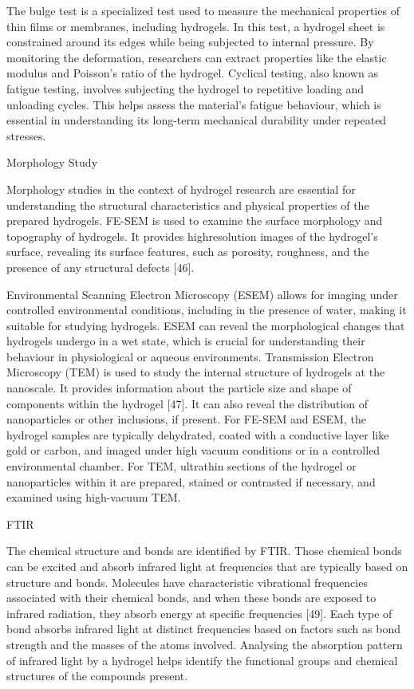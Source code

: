 \documentclass[../../main-notes.tex]{subfiles}
\begin{document}
The bulge test is a specialized test used to measure the mechanical properties of thin films or membranes, including hydrogels. 
In this test, a hydrogel sheet is constrained around its edges while being subjected to internal pressure. 
By monitoring the deformation, researchers can extract properties like the elastic modulus and Poisson’s ratio of the hydrogel. 
Cyclical testing, also known as fatigue testing, involves subjecting the hydrogel to repetitive loading and unloading cycles. 
This helps assess the material’s fatigue behaviour, which is essential in understanding its long-term mechanical durability under repeated stresses.






Morphology Study

Morphology studies in the context of hydrogel research are essential for understanding the structural characteristics and physical properties of the prepared hydrogels. 
FE-SEM is used to examine the surface morphology and topography of hydrogels. 
It provides highresolution images of the hydrogel’s surface, revealing its surface features, such as porosity, roughness, and the presence of any structural defects [46]. 

Environmental Scanning Electron Microscopy (ESEM) allows for imaging under controlled environmental conditions, including in the presence of water, making it suitable for studying hydrogels. 
ESEM can reveal the morphological changes that hydrogels undergo in a wet state, which is crucial for understanding their behaviour in physiological or aqueous environments. 
Transmission Electron Microscopy (TEM) is used to study the internal structure of hydrogels at the nanoscale.
It provides information about the particle size and shape of components within the hydrogel [47]. 
It can also reveal the distribution of nanoparticles or other inclusions, if present. For FE-SEM and ESEM, the hydrogel samples are typically dehydrated, coated with a conductive layer like gold or carbon, and imaged under high vacuum conditions or in a controlled environmental chamber. 
For TEM, ultrathin sections of the hydrogel or nanoparticles within it are prepared, stained or contrasted if necessary, and examined using high-vacuum TEM.




FTIR


The chemical structure and bonds are identified by FTIR. 
Those chemical bonds can be excited and absorb infrared light at frequencies that are typically based on structure and bonds.
Molecules have characteristic vibrational frequencies associated with their chemical bonds, and when these bonds are exposed to infrared radiation, they absorb energy at specific frequencies [49]. 
Each type of bond absorbs infrared light at distinct frequencies based on factors such as bond strength and the masses of the atoms involved. 
Analysing the absorption pattern of infrared light by a hydrogel helps identify the functional groups and chemical structures of the compounds present.
\end{document}
